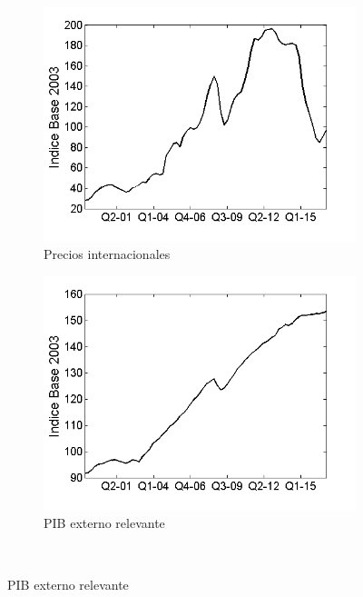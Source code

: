 \documentclass[12pt,letterpaper]{article}
\begin{document}
\begin{figure}
    ~ %
    \begin{subfigure}[b]{0.3\textwidth}
        \includegraphics[width=\textwidth]{5ippbx}
        \caption{Precios internacionales}
        \label{5ippbx}
    \end{subfigure}
    \begin{subfigure}[b]{0.3\textwidth}
        \includegraphics[width=\textwidth]{2per}
        \caption{PIB externo relevante}
        \label{2per}
    \end{subfigure}
    ~ %

\end{figure}
\end{document}
